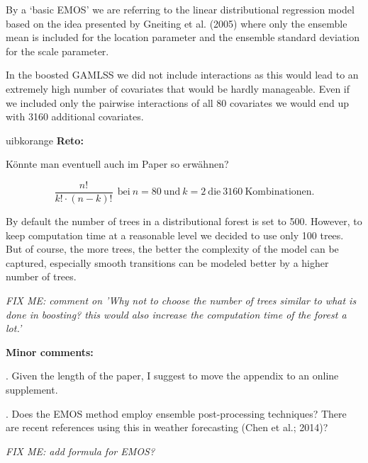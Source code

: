 \documentclass[american,foldmarks=false,noconfig]{uibklttr}
\newenvironment{review}{\fontshape{\itdefault}\fontseries{\bfdefault} \selectfont \smallskip}{\par}
\newenvironment{reto}{
    \begin{color}{uibkorange}
    \textbf{Reto:~}
        \itshape
}{
    \end{color}
}
\begin{document}
By a `basic EMOS' we are referring to the linear distributional 
regression model based on the idea presented by Gneiting et al. (2005) 
where only the ensemble mean is included for the location parameter 
and the ensemble standard deviation for the scale parameter.

In the boosted GAMLSS we did not include interactions as this would
lead to an extremely high number of covariates that would be hardly
manageable. Even if we included only the pairwise interactions of all 
80 covariates we would end up with 3160 additional covariates.


\begin{reto}
K\"onnte man eventuell auch im Paper so erw\"ahnen?

\begin{equation}
    \frac{n!}{k! \cdot (n-k)!}~~\mbox{bei}~n=80~\mbox{und}~k=2~\mbox{die}~3160~\mbox{Kombinationen.}
\end{equation}
\end{reto}



By default the number of trees in a distributional forest
is set to 500. However, to keep computation time at a 
reasonable level we decided  to use only 100 trees. 
But of course, the more trees, the better the complexity of 
the model can be captured, especially smooth transitions can 
be modeled better by a higher number of trees.

\textit{FIX ME: comment on 'Why not to choose the number of trees 
similar to what is done in boosting? this would also increase the 
computation time of the forest a lot.'}

\bigskip

\textbf{Minor comments:}


\begin{review}
1. Given the length of the paper, I suggest to move the 
appendix to an online supplement.
\end{review}


\begin{review}
2. Does the EMOS method employ ensemble post-processing 
techniques? There are recent references using this in weather 
forecasting (Chen et al.; 2014)?
\end{review}

\textit{FIX ME: add formula for EMOS?}
\end{document}
